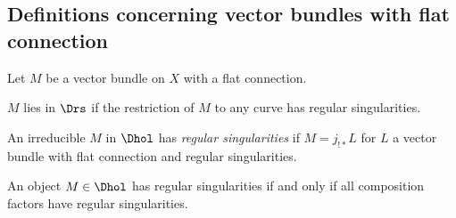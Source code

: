 \documentclass[etingof-dmod.tex]{subfiles}
\begin{document}
\subsection{Definitions concerning vector bundles with flat connection}

Let $M$ be a vector bundle on $X$ with a flat connection.
\begin{defn}
  $M$ lies in $\Drs$ if the restriction of $M$ to any curve has regular
  singularities.
\end{defn}
\begin{defn}
  An irreducible $M$ in $\Dhol$ has \textit{regular singularities} if
  $M = j_{!*}L$ for $L$ a vector bundle with flat connection and regular
  singularities.
\end{defn}
\begin{rmk}
  An object $M \in \Dhol$ has regular singularities if and only if all
  composition factors have regular singularities.
\end{rmk}
\end{document}

